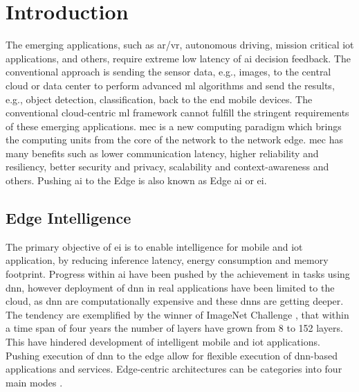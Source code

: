 \hypertarget{inroduction}{%
\chapter{Introduction}\label{sec:introduction}}
\thispagestyle{fancy}

The emerging applications, such as \gls{ar}/\gls{vr}, autonomous driving, mission critical \gls{iot} applications, and others, require extreme low latency of \gls{ai} decision feedback. The conventional approach is sending the sensor data, e.g., images, to the central cloud or data center to perform advanced \gls{ml} algorithms and send the results, e.g., object detection, classification, back to the end mobile devices. The conventional cloud-centric \gls{ml} framework cannot fulfill the stringent requirements of these emerging applications. \gls{mec} is a new computing paradigm which brings the computing units from the core of the network to the network edge. \gls{mec} has many benefits such as lower communication latency, higher reliability and resiliency, better security and privacy, scalability and context-awareness and others. Pushing \gls{ai} to the Edge is also known as Edge \gls{ai} or \gls{ei}.

\section{Edge Intelligence}

The primary objective of \gls{ei} is to enable intelligence for mobile and \gls{iot} application, by reducing inference latency, energy consumption and memory footprint. Progress within \gls{ai} have been pushed by the achievement in tasks using \gls{dnn}, however deployment of \gls{dnn} in real applications have been limited to the cloud, as \gls{dnn} are computationally expensive and these \gls{dnn}s are getting deeper. The tendency are exemplified by the winner of ImageNet Challenge \cite{russakovsky_imagenet_2015}, that within a time span of four years the number of layers have grown from 8 to 152 layers. This have hindered development of intelligent mobile and \gls{iot} applications. Pushing execution of \gls{dnn}  to the edge allow for flexible execution of \gls{dnn}-based applications and services. Edge-centric architectures can be categories into four main modes \cite{zhou_edge_2019}.

